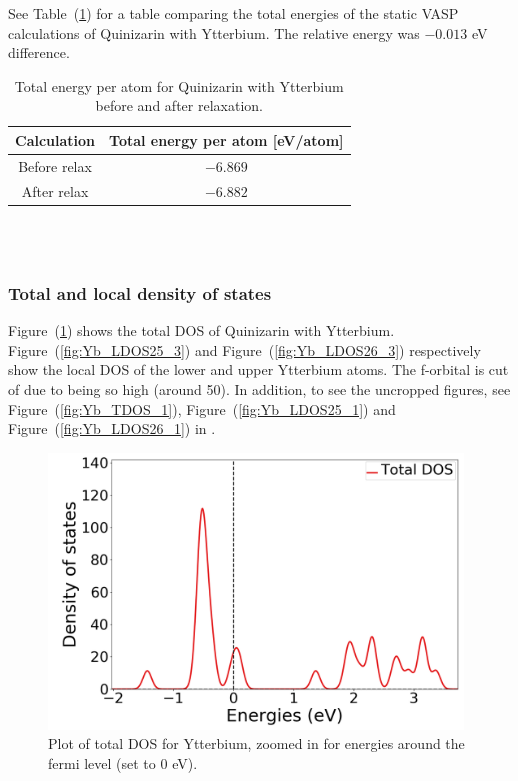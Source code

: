 \documentclass{article}
\begin{document}
      See Table~(\ref{tab:TOTENYb}) for a table comparing the total energies of the static VASP calculations of Quinizarin with Ytterbium. The relative energy was $-0.013$ eV difference. \\

      \begin{table}[H]
        \centering
        \caption{Total energy per atom for Quinizarin with Ytterbium before and after relaxation. }
        \label{tab:TOTENYb}
        \begin{tabular}{|c|c|}
            \hline
            Calculation & Total energy per atom [eV/atom]  \\
            \hline \hline
            Before relax & $-6.869$ \\
            After relax & $-6.882$ \\
            \hline
        \end{tabular} \\
        \hspace{0pt}\\
      \end{table}

      \vspace{1cm}

    \subsubsection{Total and local density of states}

      Figure~(\ref{fig:Yb_TDOS_2}) shows the total DOS of Quinizarin with Ytterbium. Figure~(\ref{fig:Yb_LDOS25_3}) and Figure~(\ref{fig:Yb_LDOS26_3}) respectively show the local DOS of the lower and upper Ytterbium atoms. The f-orbital is cut of due to being so high (around 50).
      In addition, to see the uncropped figures, see Figure~(\ref{fig:Yb_TDOS_1}), Figure~(\ref{fig:Yb_LDOS25_1}) and Figure~(\ref{fig:Yb_LDOS26_1}) in .\\

      \begin{figure}[H]
        \centering
        \includegraphics[width = 11cm]{../fig/Yb_TDOS_2.png}
        \caption{Plot of total DOS for Ytterbium, zoomed in for energies around the fermi level (set to 0 eV). }
        \label{fig:Yb_TDOS_2}
      \end{figure}
\end{document}
